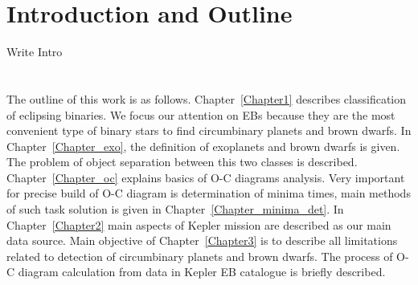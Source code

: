 \chapter{Introduction and Outline}

Write Intro
\\
\\
\\


The outline of this work is as follows. 
Chapter~\ref{Chapter1} describes classification of eclipsing bi\-na\-ries. 
We focus our attention on EBs because they are the most convenient type of \mbox{binary} stars to find circumbinary planets and brown dwarfs.
In Chapter~\ref{Chapter_exo}, the definition of exo\-planets and brown dwarfs is given. The problem of object separation between this two classes is described. Chapter~\ref{Chapter_oc} explains basics of O-C diagrams analysis. Very important for precise build of O-C diagram is determination of minima times, main methods of such task solution is given in Chapter~\ref{Chapter_minima_det}.
In Chapter~\ref{Chapter2} main aspects of Kepler mission are described as our main data source. 
Main objective of Chapter~\ref{Chapter3} is to describe all limitations related to detection of circumbinary planets and brown dwarfs. The process of O-C diagram calculation from data in Kepler EB catalogue is briefly described.
